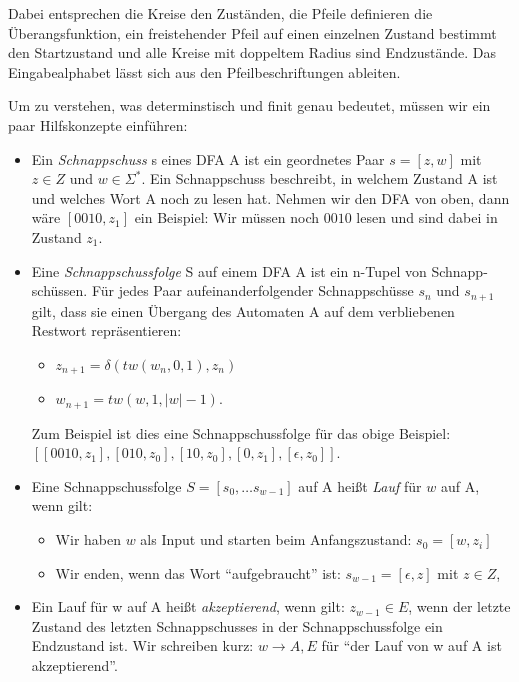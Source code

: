 Dabei entsprechen die Kreise den Zuständen,
die Pfeile definieren die Überangsfunktion,
ein freistehender Pfeil auf einen einzelnen Zustand bestimmt den Startzustand
und alle Kreise mit doppeltem Radius sind Endzustände.
Das Eingabealphabet lässt sich aus den Pfeilbeschriftungen ableiten.

Um zu verstehen, was determinstisch und finit genau bedeutet,
müssen wir ein paar Hilfskonzepte einführen:
\begin{itemize}
    \item Ein \emph{Schnappschuss} s eines DFA A ist ein geordnetes Paar $s = [z, w]$
        mit $z \in Z$ und $w \in \Sigma^*$.
        Ein Schnappschuss beschreibt,
        in welchem Zustand A ist und welches Wort A noch zu lesen hat.
        Nehmen wir den DFA von oben, dann wäre $[0010,z_1]$ ein Beispiel:
        Wir müssen noch $0010$ lesen und sind dabei in Zustand $z_1$.
    \item Eine \emph{Schnappschussfolge} S auf einem DFA A
        ist ein n-Tupel von Schnapp-schüssen. 
        Für jedes Paar aufeinanderfolgender Schnappschüsse $s_n$ und $s_{n+1}$ gilt,
        dass sie einen Übergang des Automaten A auf dem verbliebenen Restwort repräsentieren:
        \begin{itemize}
            \item $z_{n+1} = \delta(tw(w_{n},0,1), z_n)$
            \item $w_{n+1} = tw(w,1,|w|-1)$.
        \end{itemize}
        Zum Beispiel ist dies eine Schnappschussfolge für das obige Beispiel:\linebreak
        $[[0010,z_1],[010, z_0],[10, z_0],[0,z_1],[\epsilon,z_0]]$.
    \item Eine Schnappschussfolge $S = [s_0, \ldots s_{w-1}]$ auf A
        heißt \emph{Lauf} für $w$ auf A, wenn gilt:
        \begin{itemize}
            \item Wir haben $w$ als Input und starten beim Anfangszustand:
                $s_0 = [w,z_i]$ 
            \item Wir enden, wenn das Wort ``aufgebraucht'' ist:
                $s_{w-1} = [\epsilon, z]$ mit $z \in Z$,

        \end{itemize}
    \item Ein Lauf für w auf A heißt \emph{akzeptierend}, wenn gilt:
        $z_{w-1} \in E$,
        wenn der letzte Zustand des letzten Schnappschusses in der Schnappschussfolge
        ein Endzustand ist.
        Wir schreiben kurz: $w \rightarrow A,E$
        für ``der Lauf von w auf A ist akzeptierend''. 


\end{itemize}

